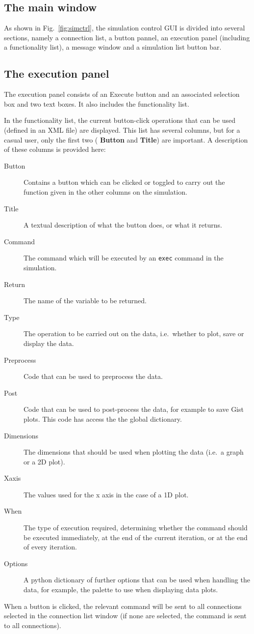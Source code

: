 \documentclass{article}
\begin{document}
\subsection{The main window}
As shown in Fig.~\ref{fig:simctrl}, the simulation control GUI is
divided into several sections, namely a connection list, a button
pannel, an execution panel (including a functionality list), a message
window and a simulation list button bar.


\subsection{The execution panel}
The execution panel consists of an Execute button and an associated
selection box and two text boxes.  It also includes the functionality
list.

In the functionality list, the current button-click operations that
can be used (defined in an XML file) are displayed.  This list has
several columns, but for a casual user, only the first two ({\bf
  Button} and {\bf Title}) are important.  A description of these
columns is provided here:
\begin{description}
\item[Button] Contains a button which can be clicked or toggled to
  carry out the function given in the other columns on the simulation.
\item[Title] A textual description of what the button does, or what it
  returns.
\item[Command] The command which will be executed by an \texttt{exec}
  command in the simulation.
\item[Return] The name of the variable to be returned.
\item[Type] The operation to be carried out on the data, i.e.\ whether
  to plot, save or display the data.
\item[Preprocess] Code that can be used to preprocess the data.
\item[Post] Code that can be used to post-process the data, for
  example to save Gist plots.  This code has access the the global
  dictionary.
\item[Dimensions] The dimensions that should be used when plotting the
  data (i.e.\ a graph or a 2D plot).
\item[Xaxis] The values used for the x axis in the case of a 1D plot.
\item[When] The type of execution required, determining whether the
  command should be executed immediately, at the end of the current
  iteration, or at the end of every iteration.
\item[Options] A python dictionary of further options that can be used
  when handling the data, for example, the palette to use when
  displaying data plots.
\end{description}
When a button is clicked, the relevant command will be sent to all
connections selected in the connection list window (if none are
selected, the command is sent to all connections).  
\end{document}
